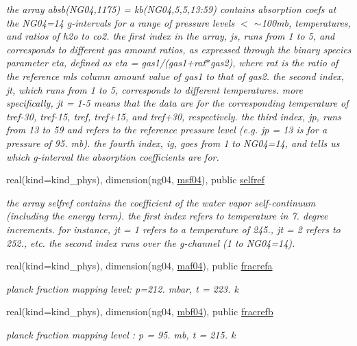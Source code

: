 \begin{DoxyCompactItemize}
\begin{DoxyCompactList}\small\item\em the array absb(\+N\+G04,1175) = kb(\+N\+G04,5,5,13\+:59) contains absorption coefs at the N\+G04=14 g-\/intervals for a range of pressure levels $<$ $\sim$100mb, temperatures, and ratios of h2o to co2. the first index in the array, js, runs from 1 to 5, and corresponds to different gas amount ratios, as expressed through the binary species parameter eta, defined as eta = gas1/(gas1+rat$\ast$gas2), where rat is the ratio of the reference mls column amount value of gas1 to that of gas2. the second index, jt, which runs from 1 to 5, corresponds to different temperatures. more specifically, jt = 1-\/5 means that the data are for the corresponding temperature of tref-\/30, tref-\/15, tref, tref+15, and tref+30, respectively. the third index, jp, runs from 13 to 59 and refers to the reference pressure level (e.\+g. jp = 13 is for a pressure of 95. mb). the fourth index, ig, goes from 1 to N\+G04=14, and tells us which g-\/interval the absorption coefficients are for. \end{DoxyCompactList}\item 
real(kind=kind\+\_\+phys), dimension(ng04, \hyperlink{group__module__radlw__kgbnn_ga4b38dd1165aca80e19697df7ae74a27a}{msf04}), public \hyperlink{group__module__radlw__kgbnn_ga696b91ef86ccbda17df10f770797cafa}{selfref}
\begin{DoxyCompactList}\small\item\em the array selfref contains the coefficient of the water vapor self-\/continuum (including the energy term). the first index refers to temperature in 7. degree increments. for instance, jt = 1 refers to a temperature of 245., jt = 2 refers to 252., etc. the second index runs over the g-\/channel (1 to N\+G04=14). \end{DoxyCompactList}\item 
real(kind=kind\+\_\+phys), dimension(ng04, \hyperlink{group__module__radlw__kgbnn_ga60ff35def4e526c7d9cf3ec88bdd4485}{maf04}), public \hyperlink{group__module__radlw__kgbnn_gace1d87742e2c543d9b0662e1c7d2b624}{fracrefa}
\begin{DoxyCompactList}\small\item\em planck fraction mapping level\+: p=212. mbar, t = 223. k \end{DoxyCompactList}\item 
real(kind=kind\+\_\+phys), dimension(ng04, \hyperlink{group__module__radlw__kgbnn_ga768f4447809fb11206dce383a121d595}{mbf04}), public \hyperlink{group__module__radlw__kgbnn_gae8d5d56d09dfbe06d918c6b098e3fddf}{fracrefb}
\begin{DoxyCompactList}\small\item\em planck fraction mapping level \+: p = 95. mb, t = 215. k \end{DoxyCompactList}\end{DoxyCompactItemize}
